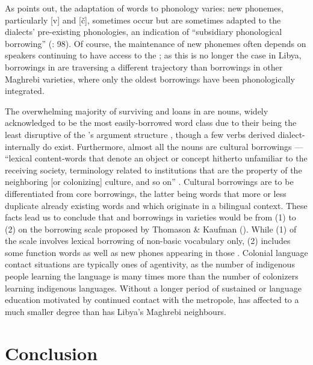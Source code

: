 \documentclass[output=paper]{langsci/langscibook}
\begin{document}
  As \citet{Danna2018phonetic} points out, the adaptation of  words to  phonology varies: new phonemes, particularly  [v] and [č], sometimes occur but are sometimes adapted to the dialects’ pre-existing phonologies, an indication of “subsidiary phonological borrowing” (\citealt{VanCoetsem1988}: 98). Of course, the maintenance of new phonemes often depends on speakers continuing to have access to the ; as this is no longer the case in Libya,  borrowings in  are traversing a different trajectory than  borrowings in other Maghrebi varieties, where only the oldest borrowings have been phonologically integrated.

  The overwhelming majority of surviving  and  loans in  are nouns, widely acknowledged to be the most easily-borrowed word class due to their being the least disruptive of the ’s argument structure \citep{Myers-Scotton2002}, though a few verbs derived dialect-internally do exist. Furthermore, almost all the nouns are cultural borrowings — “lexical content-words that denote an object or concept hitherto unfamiliar to the receiving society, terminology related to institutions that are the property of the neighboring [or colonizing] culture, and so on” \citep[210]{Matras2011universals}. Cultural borrowings are to be differentiated from core borrowings, the latter being words that more or less duplicate already existing words and which originate in a bilingual  context. These facts lead us to conclude that  and  borrowings in  varieties would be from (1) to (2) on the borrowing scale proposed by Thomason \& Kaufman (\citeyear[78–83]{ThomasonKaufman1988}). While (1) of the scale involves lexical borrowing of non-basic vocabulary only, (2) includes some function words as well as new phones appearing in those . Colonial language contact situations are typically ones of  agentivity, as the number of indigenous people learning the  language is many times more than the number of colonizers learning indigenous languages. Without a longer period of sustained  or language education motivated by continued contact with the metropole,  has affected  to a much smaller degree than  has Libya's Maghrebi neighbours.

\section{Conclusion}
\end{document}
